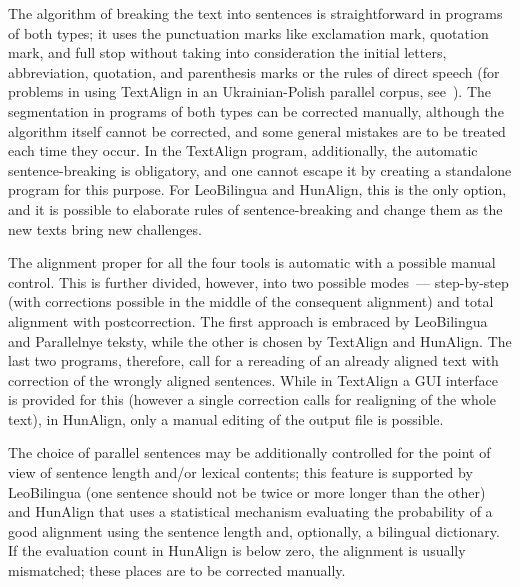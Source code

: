 \begin{multicols}{2}
   The algorithm of breaking the text into sentences is straightforward in programs of both types; it 
uses the punctuation marks like exclamation mark, quotation mark, and full stop without taking into 
consideration the initial letters, abbreviation, quotation, and parenthesis marks or the rules of direct 
speech (for problems in using TextAlign in an Ukrainian-Polish parallel corpus, see~\cite{34-zat}). 
The segmentation in programs of both types can be corrected manually, although the algorithm 
itself cannot be corrected, and some general mistakes are to be treated each time they occur. In the 
TextAlign program, additionally, the automatic sentence-breaking is obligatory, and one cannot 
escape it by creating a standalone program for this purpose. For LeoBilingua and HunAlign, this is 
the only option, and it is possible to elaborate rules of sentence-breaking and change them as the 
new texts bring new challenges.
   
   The alignment proper for all the four tools is automatic with a possible manual control. This is 
further divided, however, into two possible modes~--- step-by-step (with corrections possible in the 
middle of the consequent alignment) and total alignment with postcorrection. The first approach is 
embraced by LeoBilingua and Parallelnye teksty, while the other is chosen by TextAlign and 
HunAlign. The last two programs, therefore, call for a rereading of an already aligned text with 
correction of the wrongly aligned sentences. While in TextAlign a GUI interface is provided for this 
(however a single correction calls for realigning of the whole text), in HunAlign, only a manual 
editing of the output file is possible.
   
   The choice of parallel sentences may be additionally controlled for the point of view of sentence 
length and/or lexical contents; this feature is supported by LeoBilingua (one sentence should not be 
twice or more longer than the other) and HunAlign that uses a statistical mechanism evaluating the 
probability of a good alignment using the sentence length and, optionally, a bilingual dictionary. If 
the evaluation count in HunAlign is below zero, the alignment is usually mismatched; these places 
are to be corrected manually.
   

\end{multicols}
